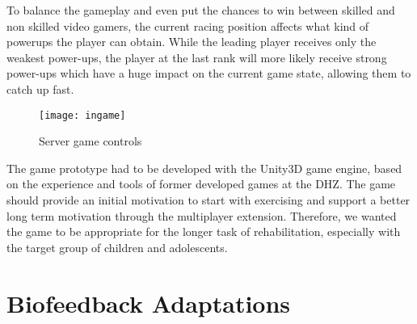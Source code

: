 \begin{multicols}{2}
To balance the gameplay and even put the chances to win between skilled and non skilled video gamers, the current racing position affects what kind of powerups the player can obtain. While the leading player receives only the weakest power-ups, the player at the last rank will more likely receive strong power-ups which have a huge impact on the current game state, allowing them to catch up fast.

\begin{figure}[H]
  \texttt{[image: ingame]}
  \caption{Server game controls}
\end{figure}


The game prototype had to be developed with the Unity3D game engine, based on the experience and tools of former developed games at the DHZ. The game should provide an initial motivation to start with exercising and support a better long term motivation through the multiplayer extension. Therefore, we wanted the game to be appropriate for the longer task of rehabilitation, especially with the target group of children and adolescents. 


\section{Biofeedback Adaptations}


\end{multicols}
